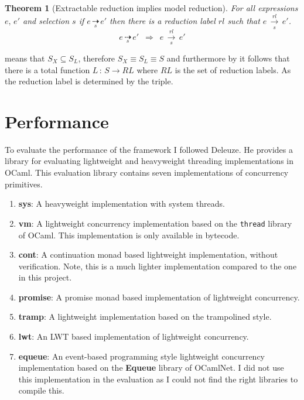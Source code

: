 \documentclass[12pt,twoside,notitlepage]{report}
\theoremstyle{plain}%
\newtheorem{thm}{Theorem}[section]
\theoremstyle{definition}
\theoremstyle{remark}
\begin{document}
\begin{thm}[Extractable reduction implies model reduction]
\label{thm:xjo_to_jo}
For all expressions $ e,\,e' $ and selection $ s $ if $ e\, \underset{s}{\dashrightarrow}\, e' $ then there is a reduction label $ rl $ such that $ e\, \underset{s}{\overset{rl}{\longrightarrow}}\, e' $.
\[ e\, \underset{s}{\dashrightarrow}\, e' \,\,\,\Rightarrow \,\,\,  e\, \underset{s}{\overset{rl}{\longrightarrow}}\, e' \]
\end{thm}

 means that $ S_X \subseteq S_L $, therefore $ S_X \equiv S_L \equiv S $ and furthermore by  it follows that there is a total function $ L\,:\, S \rightarrow RL $ where $ RL $ is the set of reduction labels. As the reduction label is determined by the triple.

\section{Performance}
\label{sec:performance_eval}
To evaluate the performance of the framework I followed Deleuze\cite{deleuzelight}. He provides a library for evaluating lightweight and heavyweight threading implementations in OCaml. This evaluation library contains seven implementations of concurrency primitives.
\begin{enumerate}
\item{\textbf{sys}: A heavyweight implementation with system threads.}
\item{\textbf{vm}: A lightweight concurrency implementation based on the \verb|thread| library of OCaml. This implementation is only available in bytecode.}
\item{\textbf{cont}: A continuation monad based lightweight implementation\cite[p.~12-13]{deleuzelight}, without verification. Note, this is a much lighter implementation compared to the one in this project.}
\item{\textbf{promise}: A promise monad based implementation of lightweight concurrency\cite[p.~13-15]{deleuzelight}.}
\item{\textbf{tramp}: A lightweight implementation based on the trampolined style\cite[p.~11-12]{deleuzelight}.}
\item{\textbf{lwt}: An LWT\cite{LWT} based implementation of lightweight concurrency.}
\item{\textbf{equeue}: An event-based programming style lightweight concurrency implementation\cite[p.~15-18]{deleuzelight} based on the \textbf{Equeue} library of OCamlNet. I did not use this implementation in the evaluation as I could not find the right libraries to compile this.}
\end{enumerate}
\end{document}
